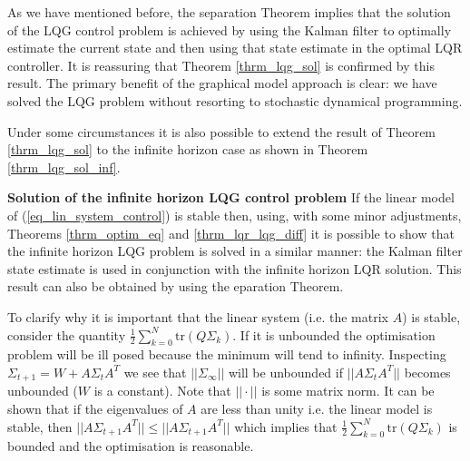 As we have mentioned before, the separation Theorem implies that the solution of the LQG control problem is achieved by using the Kalman filter to optimally estimate the current state and then using that state estimate in the optimal LQR controller. It is reassuring that Theorem \ref{thrm_lqg_sol} is confirmed by this result. The primary benefit of the graphical model approach is clear: we have solved the LQG problem without resorting to stochastic dynamical programming.

Under some circumstances it is also possible to extend the result of Theorem \ref{thrm_lqg_sol} to the infinite horizon case as shown in Theorem \ref{thrm_lqg_sol_inf}.
\begin{thrm}
\textbf{Solution of the infinite horizon LQG control problem} If the linear model of (\ref{eq_lin_system_control}) is stable then, using, with some minor adjustments, Theorems \ref{thrm_optim_eq} and \ref{thrm_lqr_lqg_diff} it is possible to show that the infinite horizon LQG problem is solved in a similar manner: the Kalman filter state estimate is used in conjunction with the infinite horizon LQR solution. This result can also be obtained by using the eparation Theorem. \label{thrm_lqg_sol_inf}
\end{thrm}
To clarify why it is important that the linear system (i.e. the matrix $A$) is stable, consider the quantity $\frac{1}{2}\sum_{k=0}^N \text{tr}(Q\Sigma_k)$. If it is unbounded the optimisation problem will be ill posed because the minimum will tend to infinity. Inspecting $\Sigma_{t+1} = W+A\Sigma_t A^T$ we see that $||\Sigma_{\infty}||$ will be unbounded if $||A\Sigma_t A^T||$ becomes unbounded ($W$ is a constant). Note that $||\cdot||$ is some matrix norm. It can be shown that if the eigenvalues of $A$ are less than unity i.e. the linear model is stable, then $||A\Sigma_{t+1}A^T|| \leq ||A\Sigma_{t+1}A^T||$ which implies that $\frac{1}{2}\sum_{k=0}^N \text{tr}(Q\Sigma_k)$ is bounded and the optimisation is reasonable.

